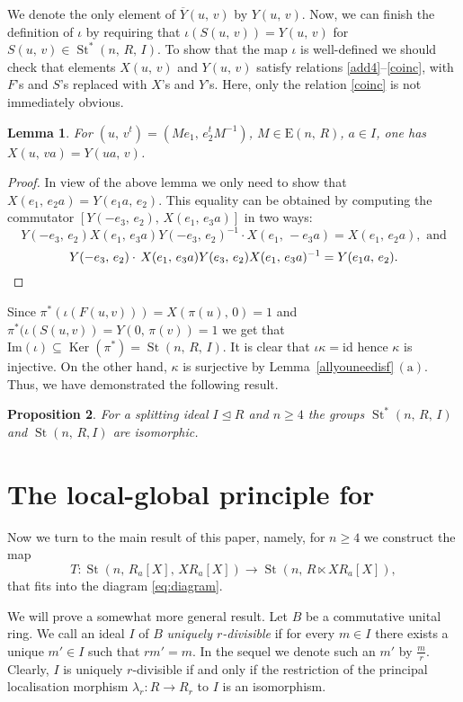 \documentclass[11pt]{amsart}
\theoremstyle{plain} \declaretheorem[name=Theorem, Refname={Theorem,Theorems}]{tm} \Crefname{tm}{Theorem}{Theorems}
\numberwithin{equation}{section}
\newtheorem{lm}{Lemma} \numberwithin{lm}{section} \Crefname{lm}{Lemma}{Lemmas}
\newtheorem{prop}[lm]{Proposition} \Crefname{prop}{Proposition}{Propositions}
\theoremstyle{definition} \newtheorem{df}[lm]{Definition} \Crefname{df}{Definition}{Definitions}
\theoremstyle{remark} \newtheorem{rk}[lm]{Remark} \Crefname{rk}{Remark}{Remarks}
\newcommand{\Ker}{\mathop{\mathrm{Ker}}\nolimits}
\newcommand{\E}{{\mathrm{E}}}
\newcommand{\St}{\mathop{\mathrm{St}}\nolimits}
\newcommand{\Kt}{\mathop{\mathrm{K_2}}\nolimits}
\newcommand{\inv}{^{-1}}
\begin{document}
We denote the only element of $\overline Y(u,\,v)$ by $Y(u,\,v)$. 
Now, we can finish the definition of $\iota$ by requiring that $\iota(S(u,\,v)) = Y(u,\,v)$ for $S(u,\,v)\in\St^*(n,\,R,\,I)$. 
To show that the map $\iota$ is well-defined we should check that elements $X(u,\,v)$ and $Y(u,\,v)$ satisfy relations \eqref{add4}--\eqref{coinc},
with $F$'s and $S$'s replaced with $X$'s and $Y$'s.
Here, only the relation \eqref{coinc} is not immediately obvious.
\begin{lm} \label{lm:XY} For $(u,\,v^t)=(Me_1,\,e_2^tM\inv)$, $M\in\E(n,\,R)$, $a\in I$, one has $X(u,\,va)=Y(ua,\,v)$. \end{lm}
\begin{proof}
In view of the above lemma we only need to show that $X(e_1,\,e_2a)=Y(e_1a,\,e_2)$.
This equality can be obtained by computing the commutator $[Y(-e_3,\,e_2),\,X(e_1,\,e_3a)]$ in two ways:
$$ Y(-e_3,\,e_2)X(e_1,\,e_3a)Y(-e_3,\,e_2)\inv\cdot X(e_1,\,-e_3a)=X(e_1,\,e_2a), \text{ and} $$
$$ Y(-e_3,\,e_2)\cdot\,X(e_1,\,e_3a)Y(e_3,\,e_2)X(e_1,\,e_3a)\inv=Y(e_1a,\,e_2). \qedhere $$
\end{proof}

Since $\pi^*(\iota(F(u, v))) = X(\pi(u),\,0)=1$ and $\pi^*(\iota(S(u,v)) = Y(0,\,\pi(v)) = 1$ we get that $\mathrm{Im}(\iota)\subseteq\Ker(\pi^*)=\St(n,\,R,\,I)$. 
It is clear that $\iota\kappa=\mathrm{id}$ hence $\kappa$ is injective.
On the other hand, $\kappa$ is surjective by Lemma~\ref{allyouneedisf}\,$(\mathrm a)$.
Thus, we have demonstrated the following result.

\begin{prop} \label{lm:map-iota}
 For a splitting ideal $I \trianglelefteq R$ and $n\geq 4$ the groups $\St^*(n,\,R,\,I)$ and $\St(n,\,R, I)$ are isomorphic.
\end{prop}
 
\section{The local-global principle for \texorpdfstring{$\Kt$}{K2}}\label{sec:lgp}
Now we turn to the main result of this paper, namely, for $n\geq 4$ we construct the map $$T\colon\St(n,\,R_a[X],\,XR_a[X])\rightarrow\St(n,\,R\ltimes XR_a[X]),$$ that fits into the diagram \eqref{eq:diagram}.

We will prove a somewhat more general result. Let $B$ be a commutative unital ring.
We call an ideal $I$ of $B$ \emph{uniquely $r$-divisible} if for every $m\in I$ there exists a unique $m'\in I$ such that $rm' = m$.
In the sequel we denote such an $m'$ by $\frac{m}{r}$.
Clearly, $I$ is uniquely $r$-divisible if and only if the restriction of the principal localisation morphism $\lambda_r\colon R \to R_r$ to $I$ is an isomorphism.
\end{document}

